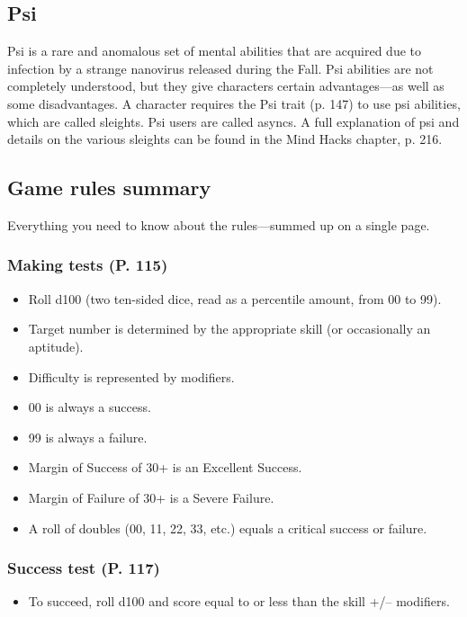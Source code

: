 \subsection{Psi} \label{sec:psi} 

Psi is a rare and anomalous set of mental abilities that are acquired due to infection by a strange nanovirus released during the Fall. Psi abilities are not completely understood, but they give characters certain advantages—as well as some disadvantages. A character requires the Psi trait (p. 147) to use psi abilities, which are called sleights. Psi users are called asyncs. A full explanation of psi and details on the various sleights can be found in the Mind Hacks chapter, p. 216. 

\subsection{Game rules summary} \label{sec:game-rules-summary} 

Everything you need to know about the rules—summed up on a single page. 

\subsubsection{Making tests (P. 115)} 

\begin{itemize} \item Roll d100 (two ten-sided dice, read as a percentile amount, from 00 to 99). \item Target number is determined by the appropriate skill (or occasionally an aptitude). \item Difficulty is represented by modifiers. \item 00 is always a success. \item 99 is always a failure. \item Margin of Success of 30+ is an Excellent Success. \item Margin of Failure of 30+ is a Severe Failure. \item A roll of doubles (00, 11, 22, 33, etc.) equals a critical success or failure. \end{itemize} 

\subsubsection{Success test (P. 117)} 

\begin{itemize} \item To succeed, roll d100 and score equal to or less than the skill +/– modifiers. \end{itemize} 

